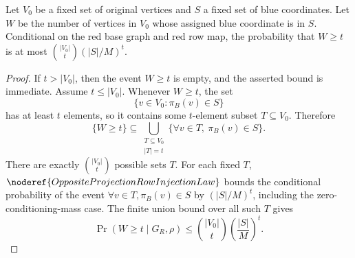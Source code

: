 \begin{lemma}
Let $V_0$ be a fixed set of original vertices and $S$ a fixed set of blue coordinates. Let $W$ be the number of vertices in $V_0$ whose assigned blue coordinate is in $S$. Conditional on the red base graph and red row map, the probability that $W \ge t$ is at most $\binom{|V_0|}{t} (|S|/M)^t$.
\end{lemma}
\begin{proof}
If \(t>|V_0|\), then the event \(W\ge t\) is empty, and the asserted bound is
immediate.  Assume \(t\le |V_0|\).  Whenever \(W\ge t\), the set
\[
\{v\in V_0:\pi_B(v)\in S\}
\]
has at least \(t\) elements, so it contains some \(t\)-element subset
\(T\subseteq V_0\).  Therefore
\[
\{W\ge t\}\subseteq
\bigcup_{\substack{T\subseteq V_0\\ |T|=t}}
\{\forall v\in T,\ \pi_B(v)\in S\}.
\]
There are exactly \(\binom{|V_0|}{t}\) possible sets \(T\).  For each fixed
\(T\), \(\noderef{OppositeProjectionRowInjectionLaw}\) bounds the conditional
probability of the event \(\forall v\in T,\pi_B(v)\in S\) by
\((|S|/M)^t\), including the zero-conditioning-mass case.  The finite union
bound over all such \(T\) gives
\[
\Pr(W\ge t\mid G_R,\rho)
\le \binom{|V_0|}{t}\left(\frac{|S|}{M}\right)^t.
\]
\end{proof}
